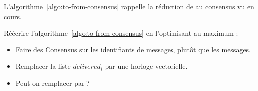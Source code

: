 
\begingroup

\begin{exercice}
  L'algorithme~\ref{algo:to-from-consensus} rappelle la réduction de  au consensus vu en cours.
  
  \begin{algorithm}
    \caption{to-broadcast dans le modèle $CAMP_{n,t}[\text{rb-broadcast}, \text{Consensus}]$ (code pour $p_i$)}\label{algo:to-from-consensus}
  \end{algorithm}

  \begin{questions}
  \item Réécrire l'algorithme~\ref{algo:to-from-consensus} en l'optimisant au maximum :
    \begin{itemize}
    \item Faire des Consensus sur les identifiants de messages, plutôt que les messages.
    \item Remplacer la liste $\mathit{delivered}_i$ par une horloge vectorielle.
    \item Peut-on remplacer  par  ? 
    \end{itemize}
  \end{questions}
  
\end{exercice}

\endgroup
\endinput
